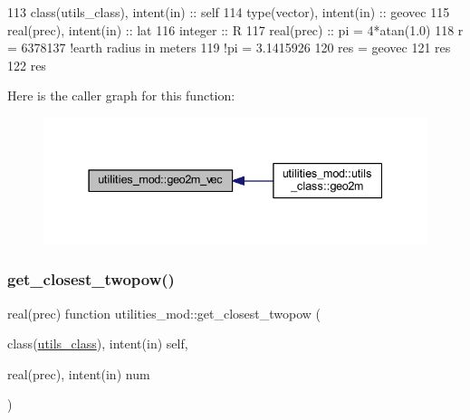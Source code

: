 \begin{DoxyCode}
113     \textcolor{keywordtype}{class}(utils\_class), \textcolor{keywordtype}{intent(in)} :: self
114     \textcolor{keywordtype}{type}(vector), \textcolor{keywordtype}{intent(in)} :: geovec
115     \textcolor{keywordtype}{real(prec)}, \textcolor{keywordtype}{intent(in)} :: lat
116     \textcolor{keywordtype}{integer} :: R
117     \textcolor{keywordtype}{real(prec)} :: pi = 4*atan(1.0)
118     r = 6378137 \textcolor{comment}{!earth radius in meters}
119     \textcolor{comment}{!pi = 3.1415926}
120     res = geovec
121     res%
122     res%
\end{DoxyCode}
Here is the caller graph for this function\+:\nopagebreak
\begin{figure}[H]
\begin{center}
\leavevmode
\includegraphics[width=337pt]{namespaceutilities__mod_a3d3d0e1568b178cd3e0bb8013642946c_icgraph}
\end{center}
\end{figure}
\mbox{\label{namespaceutilities__mod_a164054d89c012d95f63c12a6cc0ac8d7}} 
\subsubsection{\texorpdfstring{get\+\_\+closest\+\_\+twopow()}{get\_closest\_twopow()}}
{\footnotesize\ttfamily real(prec) function utilities\+\_\+mod\+::get\+\_\+closest\+\_\+twopow (\begin{DoxyParamCaption}\item[{class(\mbox{\hyperlink{structutilities__mod_1_1utils__class}{utils\+\_\+class}}), intent(in)}]{self,  }\item[{real(prec), intent(in)}]{num }\end{DoxyParamCaption})\hspace{0.3cm}{\ttfamily [private]}}



